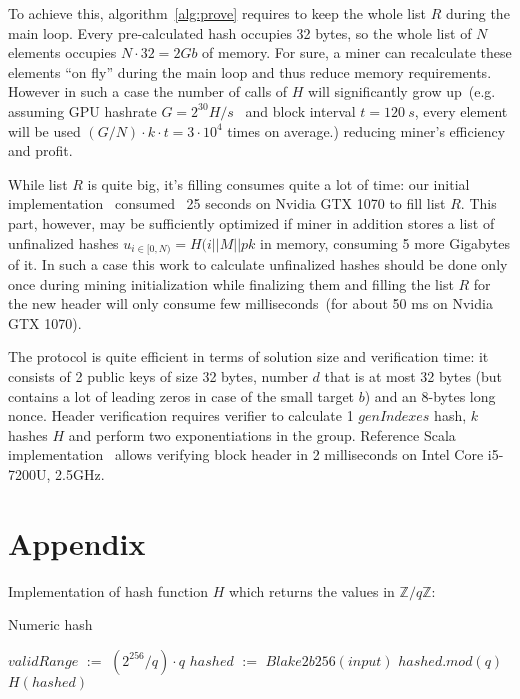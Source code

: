 \documentclass[]{article}
\def\Let#1#2{\State #1 $:=$ #2}
\begin{document}
    To achieve this, algorithm~\ref{alg:prove} requires to keep the whole list $R$ during the main loop.
    Every pre-calculated hash occupies 32 bytes, so the whole list of $N$ elements
    occupies $N \cdot 32 = 2 Gb$ of memory.
    For sure, a miner can recalculate these elements ``on fly'' during the main loop and
    thus reduce memory requirements.
    However in such a case the number of calls of $H$ will significantly grow up~(e.g.
    assuming GPU hashrate $G = 2^{30} H/s$~\cite{gpuHashrate} and block interval $t=120~s$,
    every element will be used $(G / N) \cdot k \cdot t = 3 \cdot 10^4$ times on average.)
    reducing miner's efficiency and profit.

    While list $R$ is quite big, it's filling consumes quite a lot of time: our initial implementation~\cite{ergoMiner}
    consumed ~25 seconds on Nvidia GTX 1070 to fill list $R$. This part, however, may be sufficiently
    optimized if miner in addition stores a list of unfinalized hashes $u_{i \in [0,N)}=H(i||M||pk$
    in memory, consuming 5 more Gigabytes of it. In such a case this work to calculate unfinalized hashes should
    be done only once during mining initialization while finalizing them and filling the list $R$
    for the new header will only consume few milliseconds~(for about 50 ms on Nvidia GTX 1070).

    The protocol is quite efficient in terms of solution size and verification time: it consists of 2 public keys of
    size 32 bytes, number $d$ that is at most 32 bytes
    (but contains a lot of leading zeros in case of the small target $b$) and an
    8-bytes long nonce. Header verification requires verifier to calculate 1 $genIndexes$
    hash, $k$ hashes $H$ and perform two exponentiations in the group. Reference
    Scala implementation~\cite{ergoGit} allows verifying block header in 2
    milliseconds on Intel Core i5-7200U, 2.5GHz.

    

    \section*{Appendix}
    \label{appendix}

    Implementation of hash function $H$ which returns the values in $\mathbb{Z}/q\mathbb{Z}$:

    \begin{algorithm}[H]
        \caption{Numeric hash}
        \label{alg:H}
        \begin{algorithmic}[1]
            \Let{$validRange$}{$(2^{256} / q) \cdot q$}
            \Let{$hashed$}{$Blake2b256(input)$}
            \State \Return $hashed.mod(q)$
            \Else
            \State \Return $H(hashed)$
            \EndIf
            \EndFunction
        \end{algorithmic}
    \end{algorithm}
\end{document}
